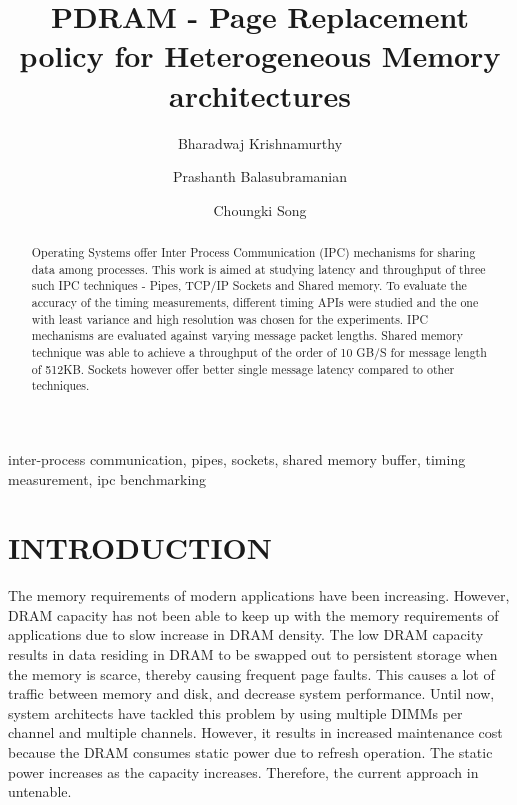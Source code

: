 \documentclass[a4paper, 11pt, conference]{ieeeconf}      %
\title{\LARGE \bf
PDRAM - Page Replacement policy for Heterogeneous Memory architectures
}
\author{Bharadwaj Krishnamurthy}
\author{Prashanth Balasubramanian}
\author{Choungki Song}
\affil{Department of Electrical Engineering \\University of Wisconsin-Madison}
\begin{document}
\maketitle
\thispagestyle{empty}
\pagestyle{empty}


\begin{abstract}

Operating Systems offer Inter Process Communication (IPC) mechanisms for sharing data among processes. This work is aimed at studying latency and throughput of three such IPC techniques - Pipes, TCP/IP Sockets and Shared memory. To evaluate the accuracy of the timing measurements, different timing APIs were studied and the one with least variance and high resolution was chosen for the experiments. IPC mechanisms are evaluated against varying message packet lengths. Shared memory technique was able to achieve a throughput of the order of 10 GB/S for message length of 512KB. Sockets however offer better single message latency compared to other techniques. 
\end{abstract}

\vspace{3mm}
\begin{keywords}
inter-process communication, pipes, sockets, shared memory buffer, timing measurement, ipc benchmarking
\end{keywords}
\vspace{5mm}


\section{INTRODUCTION}

\vspace{3mm}
	The memory requirements of modern applications have been increasing.  However, DRAM capacity has not been able to keep up with the memory requirements of applications due to slow increase in DRAM density.  The low DRAM capacity results in data residing in DRAM to be swapped out to persistent storage when the memory is scarce, thereby causing frequent page faults.  This causes a lot of traffic between memory and disk, and decrease system performance.
Until now, system architects have tackled this problem by using multiple DIMMs per channel and multiple channels. However, it results in increased maintenance cost because the DRAM consumes static power due to refresh operation.  The static power increases as the capacity increases.  Therefore, the current approach in untenable. 
\end{document}

